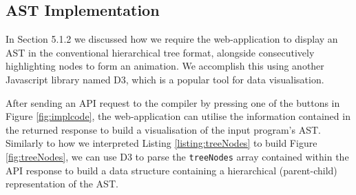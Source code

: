 \documentclass{l4proj}
\begin{document}
\subsection{AST Implementation}
In Section 5.1.2 we discussed how we require the web-application to display an AST in the conventional hierarchical tree format, alongside consecutively highlighting nodes to form an animation. We accomplish this using another Javascript library named D3, which is a popular tool for data visualisation. 

After sending an API request to the compiler by pressing one of the buttons in Figure \ref{fig:implcode}, the web-application can utilise the information contained in the returned response to build a visualisation of the input program's AST. Similarly to how we interpreted Listing \ref{listing:treeNodes} to build Figure \ref{fig:treeNodes}, we can use D3 to parse the \texttt{treeNodes} array contained within the API response to build a data structure containing a hierarchical (parent-child) representation of the AST. 
\end{document}
